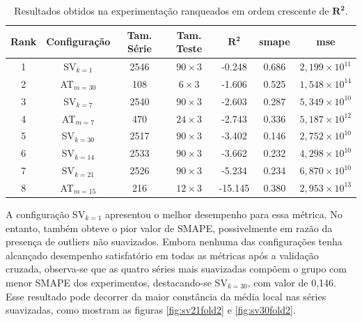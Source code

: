 \documentclass[12pt]{tcc}
\begin{document}
\begin{table}[!ht]
    \centering
    \caption{Resultados obtidos na experimentação ranqueados em ordem crescente de $\boldsymbol{R^2}$.}
    \begin{tabular}{c c c c c c c}
        \textbf{Rank} & \textbf{Configuração} & \textbf{Tam. Série} & \textbf{Tam. Teste} & $\boldsymbol{R^2}$ & \textbf{smape} & \textbf{mse} \\
        \hline
        1 & SV$_{k=1}$ & 2546 & $90 \times 3$ & -0.248 & 0.686 & $2{,}199\times10^{11}$  \\
        2 & AT$_{m=30}$ & 108 & $6 \times 3$ & -1.606 & 0.525 & $1{,}548\times10^{14}$  \\
        3 & SV$_{k=7}$ & 2540 & $90 \times 3$ & -2.603 & 0.287 & $5{,}349\times10^{10}$  \\
        4 & AT$_{m=7}$ & 470 & $24 \times 3$ & -2.743 & 0.336 & $5{,}187\times10^{12}$  \\
        5 & SV$_{k=30}$ & 2517 & $90 \times 3$ & -3.402 & 0.146 & $2{,}752\times10^{10}$  \\
        6 & SV$_{k=14}$ & 2533 & $90 \times 3$ & -3.662 & 0.232 & $4{,}298\times10^{10}$  \\
        7 & SV$_{k=21}$ & 2526 & $90 \times 3$ & -5.234 & 0.234 & $6{,}870\times10^{10}$  \\
        8 & AT$_{m=15}$ & 216 & $12 \times 3$ & -15.145 & 0.380 & $2{,}953\times10^{13}$  \\
        \hline
    \end{tabular}
    \label{tab:tabela_resultados}
\end{table}

A configuração SV$_{k=1}$ apresentou o melhor desempenho para essa métrica. No entanto, também obteve o pior valor de SMAPE, possivelmente em razão da presença de outliers não suavizados. Embora nenhuma das configurações tenha alcançado desempenho satisfatório em todas as métricas após a validação cruzada, observa-se que as quatro séries mais suavizadas compõem o grupo com menor SMAPE dos experimentos, destacando-se SV$_{k=30}$, com valor de 0{,}146. Esse resultado pode decorrer da maior constância da média local nas séries suavizadas, como mostram as figuras \ref{fig:sv21fold2} e \ref{fig:sv30fold2}. 
\end{document}
